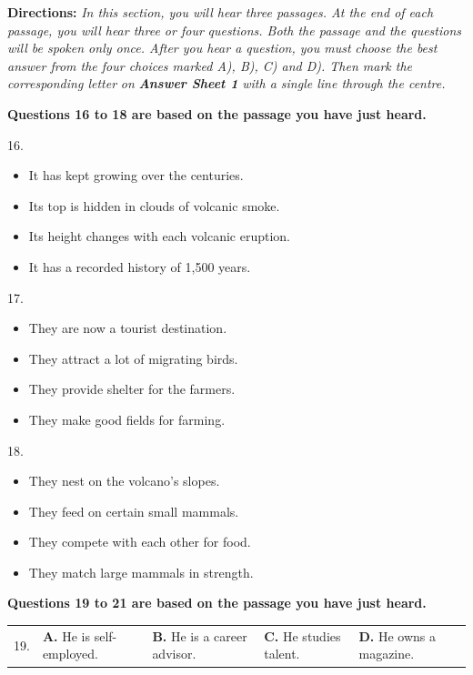 \documentclass[UTF8,11pt]{ctexart}
\begin{document}
\textbf{Directions:}\textit{ In this section, you will hear three passages. At the end of each passage, you will hear three or four} \textit{questions. Both the passage and the questions will be spoken only once. After you hear a question, you must} \textit{choose the best answer from the four choices marked A), B), C) and D). Then mark the corresponding letter} \textit{on}\textbf{\textit{ Answer Sheet 1}}\textit{ with a single line through the centre.}


\textbf{Questions 16 to 18 are based on the passage you have just heard.}


16.


\begin{itemize}[leftmargin=2em,itemsep=.2em,topsep=.4em]\item[A.] It has kept growing over the centuries.
\item[B.] Its top is hidden in clouds of volcanic smoke.
\item[C.] Its height changes with each volcanic eruption.
\item[D.] It has a recorded history of 1,500 years.
\end{itemize}

17.


\begin{itemize}[leftmargin=2em,itemsep=.2em,topsep=.4em]\item[A.] They are now a tourist destination.
\item[B.] They attract a lot of migrating birds.
\item[C.] They provide shelter for the farmers.
\item[D.] They make good fields for farming.
\end{itemize}

18.


\begin{itemize}[leftmargin=2em,itemsep=.2em,topsep=.4em]\item[A.] They nest on the volcano’s slopes.
\item[B.] They feed on certain small mammals.
\item[C.] They compete with each other for food.
\item[D.] They match large mammals in strength.
\end{itemize}

\textbf{Questions 19 to 21 are based on the passage you have just heard.}


\noindent\begin{tabularx}{\linewidth}{@{}lXXXX@{}}19. & \textbf{A.} He is self-employed. & \textbf{B.} He is a career advisor. & \textbf{C.} He studies talent. & \textbf{D.} He owns a magazine.\\\end{tabularx}\par
\end{document}
